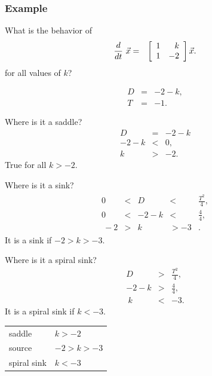 \begin{frame}
  \frametitle{Example}

  What is the behavior of
  \begin{eqnarray*}
    \deriv{~}{t} \vec{x} & = & \arrayTwo{1}{k}{1}{-2} \vec{x}.
  \end{eqnarray*}
  for all values of $k$?

  {
    \begin{eqnarray*}
      D & = & -2-k, \\
      T & = & -1.
    \end{eqnarray*}
  }



  {
    Where is it a saddle?
    \begin{eqnarray*}
      D & = & -2-k \\
      -2-k & < & 0, \\ 
      k & > & -2.
    \end{eqnarray*}
    True for all $k>-2$.
  }


  {
    Where is it a sink?
    \begin{eqnarray*}
      \begin{array}{rcccl}
        0 & < & D & < & \frac{T^2}{4}, \\
        0 & < & -2-k & < & \frac{4}{4}, \\\
        -2 & > &  k & > -3& .
      \end{array}
    \end{eqnarray*}
    It is a sink if $-2 > k  > -3$.
  }

  {
    Where is it a spiral sink?
    \begin{eqnarray*}
        D  & > & \frac{T^2}{4}, \\
        -2-k & > & \frac{4}{4}, \\\
        k  & < & -3.
    \end{eqnarray*}
    It is a spiral sink if $k < -3$.
  }

  {
    \begin{tabular}{ll}
      saddle        & $k>-2$\\
      source        & $-2 > k  > -3$ \\
      spiral sink   & $k < -3$
    \end{tabular}
  }



\end{frame}


